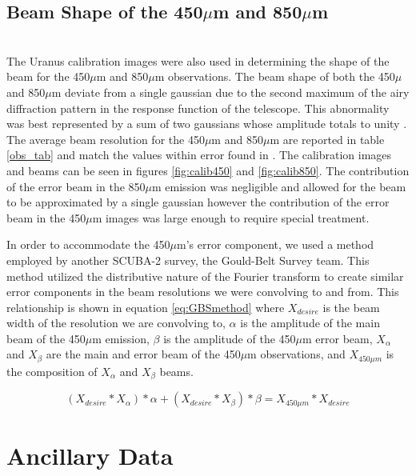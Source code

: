 \subsection{Beam Shape of the 450$\mu$m and 850$\mu$m} \\
The Uranus calibration images were also used in determining the shape of the beam for the 450$\mu$m and 850$\mu$m observations.  The beam shape of both the 450$\mu$ and 850$\mu$m deviate from a single gaussian due to the second maximum of the airy diffraction pattern in the response function of the telescope.  This abnormality was best represented by a sum of two gaussians whose amplitude totals to unity \citet{dempsey2013}.  The average beam resolution for the 450$\mu$m and 850$\mu$m are reported in table \ref{obs_tab} and match the values within error found in \citet{dempsey2013}.  The calibration images and beams can be seen in figures \ref{fig:calib450} and \ref{fig:calib850}.  The contribution of the error beam in the 850$\mu$m emission was negligible and allowed for the beam to be approximated by a single gaussian however the contribution of the error beam in the 450$\mu$m images was large enough to require special treatment.


In order to accommodate the 450$\mu$m's error component, we used a method employed by another SCUBA-2 survey, the Gould-Belt Survey team.  This method utilized the distributive nature of the Fourier transform to create similar error components in the beam resolutions we were convolving to and from.  This relationship is shown in equation \ref{eq:GBSmethod} where $X_{desire}$ is the beam width of the resolution we are convolving to, $\alpha$ is the amplitude of the main beam of the 450$\mu$m emission, $\beta$ is the amplitude of the 450$\mu$m error beam, $X_{\alpha}$ and $X_{\beta}$ are the main and error beam of the 450$\mu$m observations, and $X_{450\mu m}$ is the composition of $X_{\alpha}$ and $X_{\beta}$ beams.

\begin{equation} \label{eq:GBSmethod}
  \left(X_{desire} \ast X_{\alpha}\right)*\alpha + \left(X_{desire} \ast X_{\beta}\right)*\beta = X_{450\mu m} \ast X_{desire}
\end{equation}

\section{Ancillary Data}

